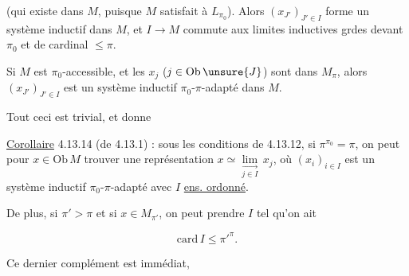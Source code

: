 
(qui existe dans $M$, puisque $M$ satisfait à $L_{\pi_0}$). Alors  $(x_{J'})_{J'\in I}$ forme un système inductif dans $M$, et $I\longrightarrow M$ commute aux limites inductives grdes devant $\pi_0$ et de cardinal $\leq\pi$.

Si $M$ est $\pi_0$-accessible, et les $x_j$ ($j\in\mathrm{Ob}\,\unsure{J}$) sont dans $M_\pi$, alors $(x_{J'})_{J'\in I}$ est un système inductif $\pi_0$-$\pi$-adapté dans $M$.

Tout ceci est  trivial, et donne

\uline{Corollaire} 4.13.14 (de 4.13.1) : sous les conditions de 4.13.12, si $\pi^{\pi_0}=\pi$, on peut pour  $x\in\mathrm{Ob}\,M$ trouver une représentation $x\simeq\underset{j\in I}{\underset{\longrightarrow}{\lim}}\,x_j$, où $(x_i)_{i\in I}$ est un système inductif $\pi_0$-$\pi$-adapté avec $I$ \uline{ens. ordonné}.

 De plus, si $\pi'>\pi$ et si $x\in M_{\pi'}$, on peut prendre $I$ tel qu'on ait

\[
\mathrm{card}\,I\leq{\pi'}^{\pi}.
\]

Ce dernier complément est immédiat,

